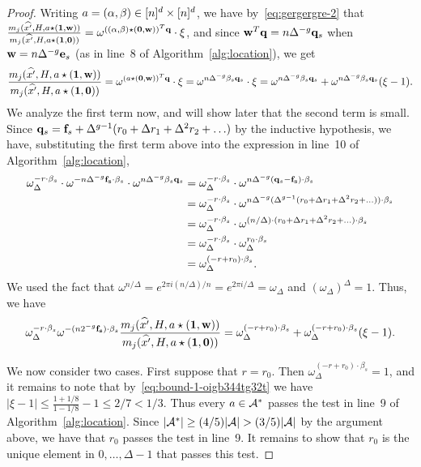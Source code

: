 \begin{proof}
Writing $a=(\alpha, \beta)\in{[n]^d}\times {[n]^d}$, we have by~\eqref{eq:gergergre-2} that $\frac{m_j(\widehat{x'}, H, a\star (\mathbf{1}, \mathbf{w}))}{m_j(\widehat{x'}, H, a\star (\mathbf{1}, \mathbf{0}))}=\omega^{((\alpha, \beta)\star (\mathbf{0}, \mathbf{w}))^T {\bf q}}\cdot\xi$, and since $\mathbf{w}^T{\bf q}=n\Delta^{-g}{\bf q}_s$ when $\mathbf{w}=n \Delta^{-g} {\bf e}_s$ (as in line~8 of Algorithm~\ref{alg:location}), we get 
$$
\frac{m_j(\widehat{x'}, H, a\star (\mathbf{1}, \mathbf{w}))}{m_j(\widehat{x'}, H, a\star (\mathbf{1}, \mathbf{0}))}=\omega^{(a\star (\mathbf{0}, \mathbf{w}))^T {\bf q}}\cdot\xi=\omega^{n\Delta^{-g} \beta_s {\bf q}_s}\cdot\xi=\omega^{n\Delta^{-g} \beta_s {\bf q}_s}+\omega^{n\Delta^{-g} \beta_s {\bf q}_s}(\xi-1). 
$$
We analyze the first term now, and will show later that the second term is small. Since ${\bf q}_s={\bf f}_s+\Delta^{g-1}(r_0+\Delta r_1+\Delta^2 r_2+\ldots)$ by the inductive hypothesis, we have, substituting the first term above into the expression in line~10 of Algorithm~\ref{alg:location},
\begin{equation*}
\begin{split}
\omega_\Delta^{-r\cdot \beta_s}\cdot \omega^{-n\Delta^{-g}{\bf f_s}\cdot \beta_s}\cdot \omega^{n\Delta^{-g} \beta_s {\bf q}_s}&=\omega_\Delta^{-r\cdot \beta_s}\cdot \omega^{n\Delta^{-g}({\bf q}_s-{\bf f_s})\cdot \beta_s}\\
&=\omega_\Delta^{-r\cdot \beta_s}\cdot \omega^{n\Delta^{-g}(\Delta^{g-1}(r_0+\Delta r_1+\Delta^2 r_2+\ldots))\cdot \beta_s}\\
&=\omega_\Delta^{-r\cdot \beta_s}\cdot \omega^{(n/\Delta)\cdot (r_0+\Delta r_1+\Delta^2 r_2+\ldots)\cdot \beta_s}\\
&=\omega_\Delta^{-r\cdot \beta_s}\cdot \omega_{\Delta}^{r_0\cdot \beta_s}\\
&=\omega_\Delta^{(-r+r_0)\cdot \beta_s}.
\end{split}
\end{equation*}
We used the fact that $\omega^{n/\Delta}=e^{2\pi i (n/\Delta)/n}=e^{2\pi i/\Delta}=\omega_\Delta$ and $(\omega_{\Delta})^\Delta=1$. Thus, we have
\begin{equation}\label{eq:92hg34grggggdds}
\omega_{\Delta}^{-r\cdot \beta_s}\omega^{-(n2^{-g}{\bf f_s})\cdot \beta_s}\frac{m_j(\widehat{x'}, H, a\star (\mathbf{1}, \mathbf{w}))}{m_j(\widehat{x'}, H, a\star (\mathbf{1}, \mathbf{0}))}=\omega_\Delta^{(-r+r_0)\cdot \beta_s}+\omega_\Delta^{(-r+r_0)\cdot \beta_s}(\xi-1).
\end{equation}

We now consider two cases. First suppose that $r=r_0$. Then $\omega_\Delta^{(-r+r_0)\cdot \beta_s}=1$, and it remains to note that  by~\eqref{eq:bound-1-oigb344tg32t} we have $|\xi-1|\leq \frac{1+1/8}{1-1/8}-1\leq 2/7< 1/3$.
Thus every $a\in {\mathcal{A}}^*$ passes the test in line~9 of Algorithm~\ref{alg:location}. Since $|\A^*|\geq (4/5)|\A|>(3/5)|\A|$ by the argument above, we have that $r_0$ passes the test in line~9. It remains to show that $r_0$ is the unique element in $0,\ldots, \Delta-1$ that passes this test.


\end{proof}
